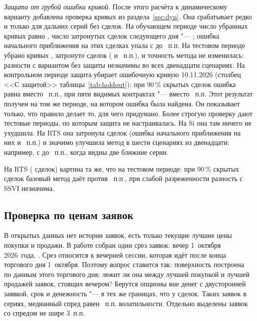 \documentclass{article}
\begin{document}
\emph{Защита от грубой ошибки кривой.} После этого расчёта к динамическому варианту добавлена проверка кривых из раздела~\ref{sec:dyn}. Она срабатывает редко и только для дальних серий без сделок. На обучающем периоде число убранных кривых равно , число затронутых сделок следующего дня "--- ; ошибка начального приближения на этих сделках упала с  до ~п.п. На тестовом периоде убрано кривых , затронуто сделок  ( и ~п.п.), и точность метода не изменилась: разности с вариантом без защиты незначимы во всех двенадцати сценариях. На контрольном периоде защита убирает ошибочную кривую 10.11.2026 (столбец <<С защитой>> таблицы~\ref{tab:holdout}): при 90\,\% скрытых сделок ошибка равна  вместо ~п.п., при пяти видимых контрактах "---  вместо ~п.п. Этот результат получен на том же периоде, на котором ошибка была найдена. Он показывает только, что правило делает то, для чего придумано. Более строгую проверку дают тестовые периоды, по которым защита не настраивалась. На Si она там ничего не ухудшила. На RTS она затронула  сделок (ошибка начального приближения на них  и ~п.п.) и значимо улучшила метод в шести сценариях из двенадцати: например, с  до ~п.п., когда видны две ближние серии.

На RTS ( сделок) картина та же, что на тестовом периоде: при 90\,\% скрытых сделок базовый метод даёт  против ~п.п., при слабой разреженности разность с SSVI незначима.

\subsection{Проверка по ценам заявок}\label{sec:quotes}

В открытых данных нет истории заявок, есть только текущие лучшие цены покупки и продажи. В работе собран один срез заявок: вечер 1~октября 2026~года, . Срез относится к вечерней сессии, которая идёт после конца торгового дня 1~октября. Поэтому вопрос ставится так: поверхность построена по данным этого торгового дня; лежит ли она между лучшей покупкой и лучшей продажей заявок, стоящих вечером? Берутся опционы вне денег с двусторонней заявкой, срок и денежность "--- в тех же границах, что у сделок. Таких заявок  в  сериях, медианный спред равен ~п.п. волатильности. Отдельно выделены  заявок со спредом не шире 3~п.п.
\end{document}
